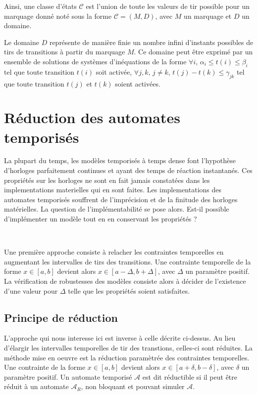         Ainsi, une classe d'états $\mathcal{C}$ est l'union de toute les valeurs
        de tir possible pour un marquage donné noté sous la forme $\mathcal{C} =
        (M,D)$, avec $M$ un marquage et $D$ un domaine.

        Le domaine $D$ représente de manière finie un nombre infini d'instants
        possibles de tirs de transitions à partir du marquage $M$. Ce domaine
        peut être exprimé par un ensemble de solutions de systèmes d'inéquations
        de la forme $\forall i$, $\alpha_i \leq t(i) \leq \beta_i$ tel que toute
        transition $t(i)$ soit activée, $\forall j, k$, $j \neq k$, $t(j) - t(k)
        \leq \gamma_{jk}$ tel que toute transition $t(j)$ et $t(k)$ soient
        activées.

  \section{Réduction des automates temporisés }
  \label{sec:shrinking-timed-automata}

    La plupart du temps, les modèles temporisés à temps dense font l'hypothèse
    d'horloges parfaitement continues et ayant des temps de réaction
    instantanés. Ces propriétés sur les horloges ne sont en fait jamais
    constatées dans les implementations materielles qui en sont faites. Les
    implementations des automates temporisés souffrent de l'imprécision et de la
    finitude des horloges matérielles. La question de l'implémentabilité se pose
    alors. Est-il possible d'implémenter un modèle tout en en conservant les
    propriétés ?
    
    ~

    Une première approche \cite{dewulf04} consiste à relacher les contraintes
    temporelles en augmentant les intervalles de tirs des transitions. Une
    contrainte temporelle de la forme $x \in [a, b]$ devient alors $x \in
    [a-\Delta, b+\Delta]$, avec $\Delta$ un paramètre positif. La vérification
    de robustesses des modèles consiste alors à décider de l'existence d'une
    valeur pour $\Delta$ telle que les propriétés soient satisfaites.
    
    \subsection{Principe de réduction}
    
      L'approche qui nous interesse ici \cite{sankur14} est inverse à celle
      décrite ci-dessus. Au lieu d'élargir les intervalles temporelles de tir
      des transtions, celles-ci sont réduites. La méthode mise en oeuvre est la
      réduction paramètrée des contraintes temporelles. Une contrainte de la
      forme $x \in [a, b]$ devient alors $x \in [a+\delta, b-\delta]$, avec
      $\delta$ un paramètre positif. Un automate temporisé $\mathcal{A}$ est dit
      réductible si il peut être réduit à un automate $\mathcal{A}_R$, non
      bloquant et pouvant simuler $\mathcal{A}$.
    
